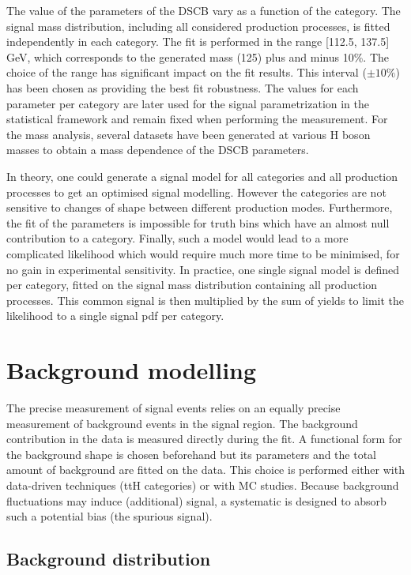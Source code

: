 The value of the parameters of the DSCB vary as a function of the category.
The signal mass distribution, including all considered production processes, is fitted independently in each category.
The fit is performed in the range [112.5, 137.5] GeV, which corresponds to the generated mass (125) plus and minus 10\%.
The choice of the range has significant impact on the fit results.
This interval ($\pm 10\%$) has been chosen as providing the best fit robustness.
The values for each parameter per category are later used for the signal parametrization in the statistical framework and remain fixed when performing the measurement.
For the mass analysis, several datasets have been generated at various H boson masses to obtain a mass dependence of the DSCB parameters.

In theory, one could generate a signal model for all categories and all production processes to get an optimised signal modelling.
However the categories are not sensitive to changes of shape between different production modes.
Furthermore, the fit of the parameters is impossible for truth bins which have an almost null contribution to a category.
Finally, such a model would lead to a more complicated likelihood which would require much more time to be minimised, for no gain in experimental sensitivity.
In practice, one single signal model is defined per category, fitted on the signal mass distribution containing all production processes.
This common signal is then multiplied by the sum of yields to limit the likelihood to a single signal pdf per category.

\section{Background modelling}
\label{sec:orgb6f3d36}
\label{sec:HGam_backgroundModelling}

The precise measurement of signal events relies on an equally precise measurement of background events in the signal region.
The background contribution in the data is measured directly during the fit.
A functional form for the background shape is chosen beforehand but its parameters and the total amount of background are fitted on the data.
This choice is performed either with data-driven techniques (ttH categories) or with MC studies.
Because background fluctuations may induce (additional) signal, a systematic is designed to absorb such a potential bias (the spurious signal).

\subsection{Background distribution}
  \label{sec:orge7b221f}

